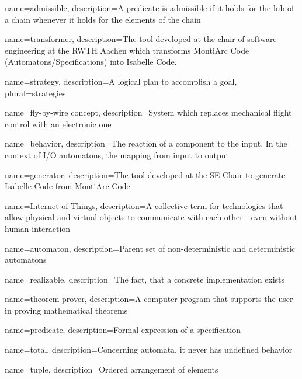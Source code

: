 
{
    name=admissible,
    description={A predicate is admissible if it holds for the lub of a chain whenever it holds for the elements of the chain}
}

{
    name=transformer,
    description={The tool developed at the chair of software engineering at the RWTH Aachen which transforms MontiArc Code (Automatons/Specifications) into Isabelle Code.}
}

{
    name=strategy,
    description={A logical plan to accomplish a goal},
    plural=strategies
}

{
    name={fly-by-wire concept},
    description={System which replaces mechanical flight control with an electronic one}
}

{
    name={behavior},
    description={The reaction of a component to the input. In the context of I/O automatons, the mapping from input to output}
}

{
    name={generator},
    description={The tool developed at the SE Chair to generate Isabelle Code from MontiArc Code}
}

{
    name={Internet of Things},
    description={A collective term for technologies that allow physical and virtual objects to communicate with each other - even without human interaction}
}

{
    name=automaton,
    description={Parent set of non-deterministic and deterministic automatons}
}

{
    name=realizable,
    description={The fact, that a concrete implementation exists}
}

{
    name={theorem prover},
    description={A computer program that supports the user in proving mathematical theorems}
}

{
    name={predicate},
    description={Formal expression of a specification}
}

{
    name={total},
    description={Concerning automata, it never has undefined behavior}
}

{
    name={tuple},
    description={Ordered arrangement of elements}
}

